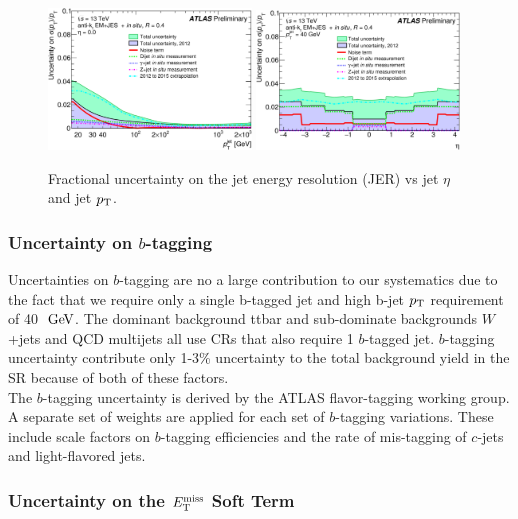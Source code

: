 \begin{figure}[!htbp]
\begin{center}
\includegraphics[width=0.48\textwidth]{figures/JetCalib/JER_pt.png}
\includegraphics[width=0.48\textwidth]{figures/JetCalib/JER_eta.png}
\caption{Fractional uncertainty on the jet energy resolution (JER) vs jet $\eta$ and jet $p_{\mathrm{T}}$.  }
\label{fig:sys:JES}
\end{center}
\end{figure}

\subsubsection*{Uncertainty on $b$-tagging}

\indent Uncertainties on $b$-tagging are no a large contribution to our systematics due to the fact that we require only a single b-tagged jet and high b-jet $p_{\mathrm{T}}$ requirement of 40 $\gev$.  The dominant background ttbar and sub-dominate backgrounds $W$+jets and QCD multijets all use CRs that also require 1 $b$-tagged jet.  $b$-tagging uncertainty contribute only 1-3\% uncertainty to the total background yield in the SR because of both of these factors.  \\

\indent  The $b$-tagging uncertainty is derived by the ATLAS flavor-tagging working group.  A separate set of weights are applied for each set of $b$-tagging variations.  These include scale factors on $b$-tagging efficiencies and the rate of mis-tagging of $c$-jets and light-flavored jets. \\

\subsubsection*{Uncertainty on the $E_{\mathrm{T}}^{\mathrm{miss}}$ Soft Term}

